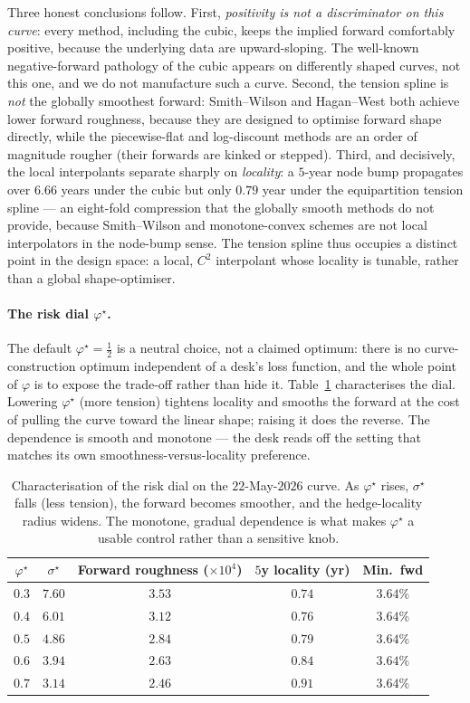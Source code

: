 \documentclass[]{interact}
\theoremstyle{plain}
\begin{document}
Three honest conclusions follow. First, \emph{positivity is not a discriminator on this curve}:
every method, including the cubic, keeps the implied forward comfortably positive, because the
underlying data are upward-sloping. The well-known negative-forward pathology of the cubic
appears on differently shaped curves, not this one, and we do not manufacture such a curve.
Second, the tension spline is \emph{not} the globally smoothest forward: Smith--Wilson and
Hagan--West both achieve lower forward roughness, because they are designed to optimise forward
shape directly, while the piecewise-flat and log-discount methods are an order of magnitude
rougher (their forwards are kinked or stepped). Third, and decisively, the local interpolants
separate sharply on \emph{locality}: a $5$-year node bump propagates over $6.66$ years under the
cubic but only $0.79$ year under the equipartition tension spline --- an eight-fold compression
that the globally smooth methods do not provide, because Smith--Wilson and monotone-convex
schemes are not local interpolators in the node-bump sense. The tension spline thus occupies a
distinct point in the design space: a local, $C^2$ interpolant whose locality is tunable, rather
than a global shape-optimiser.

\paragraph{The risk dial $\varphi^\star$.} The default $\varphi^\star=\tfrac12$ is a neutral
choice, not a claimed optimum: there is no curve-construction optimum independent of a desk's
loss function, and the whole point of $\varphi$ is to expose the trade-off rather than hide it.
Table~\ref{tab:phisweep} characterises the dial. Lowering $\varphi^\star$ (more tension)
tightens locality and smooths the forward at the cost of pulling the curve toward the linear
shape; raising it does the reverse. The dependence is smooth and monotone --- the desk reads off
the setting that matches its own smoothness-versus-locality preference.

\begin{table}[h]\centering\small
\begin{tabular}{ccccc}
\hline
$\varphi^\star$ & $\sigma^\star$ & Forward roughness ($\times10^4$) & $5$y locality (yr) & Min.\ fwd\\
\hline
$0.3$ & $7.60$ & $3.53$ & $0.74$ & $3.64\%$\\
$0.4$ & $6.01$ & $3.12$ & $0.76$ & $3.64\%$\\
$0.5$ & $4.86$ & $2.84$ & $0.79$ & $3.64\%$\\
$0.6$ & $3.94$ & $2.63$ & $0.84$ & $3.64\%$\\
$0.7$ & $3.14$ & $2.46$ & $0.91$ & $3.64\%$\\
\hline
\end{tabular}
\caption{Characterisation of the risk dial on the $22$-May-$2026$ curve. As $\varphi^\star$ rises,
$\sigma^\star$ falls (less tension), the forward becomes smoother, and the hedge-locality radius
widens. The monotone, gradual dependence is what makes $\varphi^\star$ a usable control rather
than a sensitive knob.}\label{tab:phisweep}
\end{table}
\end{document}
